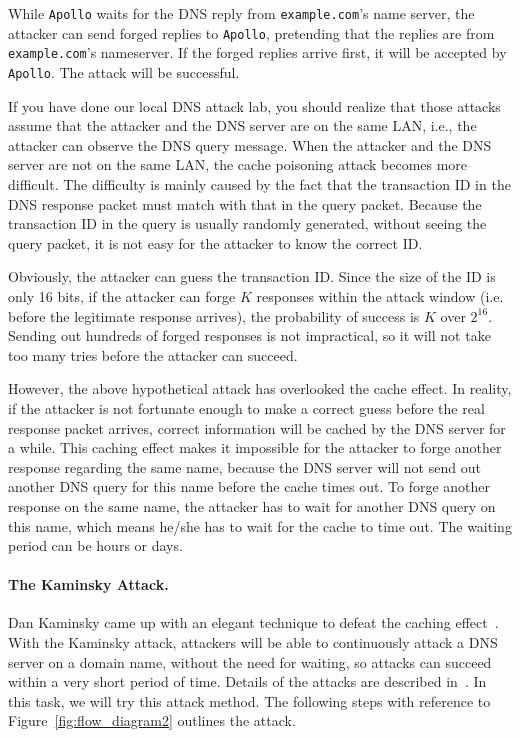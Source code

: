 While {\tt Apollo} waits for the DNS reply from {\tt example.com}'s name
server, the attacker can send forged replies to {\tt Apollo}, pretending 
that the replies are from {\tt example.com}'s nameserver. If the forged 
replies arrive first, it will be accepted by {\tt Apollo}. The attack will
be successful.


If you have done our local DNS attack lab, you should realize that 
those attacks assume that the attacker and the DNS server are on
the same LAN, i.e., the attacker can observe the DNS query message. 
When the attacker and the DNS server are not on the same LAN,
the cache poisoning attack becomes more difficult.
The difficulty is mainly caused by the fact that the transaction ID
in the DNS response packet must match with that 
in the query packet. Because the transaction ID in the query is 
usually randomly generated, without seeing the query packet,
it is not easy for the attacker to know the correct ID.


Obviously, the attacker can guess the transaction ID. Since the
size of the ID is only 16 bits, if the attacker can forge $K$ 
responses within the attack window (i.e. before the legitimate
response arrives), the probability of success is $K$ over $2^{16}$.
Sending out hundreds of forged responses is not impractical, so
it will not take too many tries before the attacker can succeed. 


However, the above hypothetical attack has overlooked the cache effect.
In reality, if the attacker is not fortunate enough to make a correct guess before
the real response packet arrives, correct information will be cached 
by the DNS server for a while. This caching effect makes it impossible
for the attacker to forge another response regarding the same 
name, because the DNS server will not send out another DNS query for 
this name before the cache times out.
To forge another response on the same name, the attacker has to 
wait for another DNS query on this name, which means he/she has to
wait for the cache to time out. The waiting period can be hours or days.


\paragraph{The Kaminsky Attack.} 
Dan Kaminsky came up with an elegant technique to defeat the caching
effect~\cite{dns:Kaminsky}.
With the Kaminsky attack, attackers will be able to continuously attack
a DNS server on a domain name, without the need for waiting, so
attacks can succeed within a very short period of time.
Details of the attacks are described in~\cite{dns:Kaminsky,seedbook}. 
In this task, we will try this attack method. The following steps with reference to 
Figure~\ref{fig:flow_diagram2} outlines the attack. 

